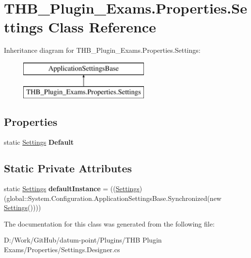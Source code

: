\hypertarget{class_t_h_b___plugin___exams_1_1_properties_1_1_settings}{}\section{T\+H\+B\+\_\+\+Plugin\+\_\+\+Exams.\+Properties.\+Settings Class Reference}
\label{class_t_h_b___plugin___exams_1_1_properties_1_1_settings}
Inheritance diagram for T\+H\+B\+\_\+\+Plugin\+\_\+\+Exams.\+Properties.\+Settings\+:\begin{figure}[H]
\begin{center}
\leavevmode
\includegraphics[height=2.000000cm]{dc/d5b/class_t_h_b___plugin___exams_1_1_properties_1_1_settings}
\end{center}
\end{figure}
\subsection*{Properties}
\begin{DoxyCompactItemize}
\item 
\mbox{\label{class_t_h_b___plugin___exams_1_1_properties_1_1_settings_a66f1b0647e31c1a4ca44a07101154767}} 
static \mbox{\hyperlink{class_t_h_b___plugin___exams_1_1_properties_1_1_settings}{Settings}} {\bfseries Default}
\end{DoxyCompactItemize}
\subsection*{Static Private Attributes}
\begin{DoxyCompactItemize}
\item 
\mbox{\label{class_t_h_b___plugin___exams_1_1_properties_1_1_settings_a9aa1e91ef757890464a72793f1eb73f5}} 
static \mbox{\hyperlink{class_t_h_b___plugin___exams_1_1_properties_1_1_settings}{Settings}} {\bfseries default\+Instance} = ((\mbox{\hyperlink{class_t_h_b___plugin___exams_1_1_properties_1_1_settings}{Settings}})(global\+::\+System.\+Configuration.\+Application\+Settings\+Base.\+Synchronized(new \mbox{\hyperlink{class_t_h_b___plugin___exams_1_1_properties_1_1_settings}{Settings}}())))
\end{DoxyCompactItemize}


The documentation for this class was generated from the following file\+:\begin{DoxyCompactItemize}
\item 
D\+:/\+Work/\+Git\+Hub/datum-\/point/\+Plugins/\+T\+H\+B Plugin Exams/\+Properties/Settings.\+Designer.\+cs\end{DoxyCompactItemize}
